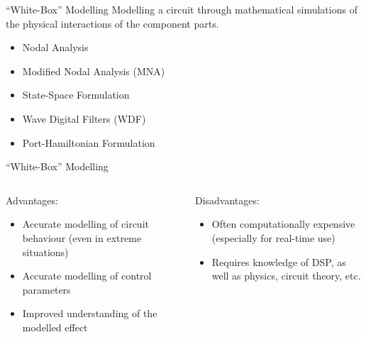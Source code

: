 \begin{frame}{``White-Box'' Modelling}
    Modelling a circuit through mathematical simulations of
    the physical interactions of the component parts.
    \vspace{1ex}
    \begin{itemize}
        \itemsep0em
        \item Nodal Analysis
        \item Modified Nodal Analysis (MNA)
        \item State-Space Formulation
        \item Wave Digital Filters (WDF)
        \item Port-Hamiltonian Formulation
    \end{itemize}
\end{frame}

\begin{frame}{``White-Box'' Modelling}
    \begin{columns}
        \begin{column}{0.5\linewidth}
            \hspace{-1ex}
            Advantages:
            \vspace{1ex}
            \begin{itemize}
                \itemsep0.5em
                \item Accurate modelling of circuit behaviour (even in extreme situations)
                \item Accurate modelling of control parameters
                \item Improved understanding of the modelled effect
            \end{itemize}
        \end{column}
        \begin{column}{0.5\linewidth}
            \hspace{-1ex}
            Disadvantages:
            \vspace{1ex}
            \begin{itemize}
                \itemsep0.5em
                \item Often computationally expensive (especially for real-time use) 
                \item Requires knowledge of DSP, as well as physics, circuit theory, etc.
            \end{itemize}
        \end{column}
    \end{columns}
\end{frame}


